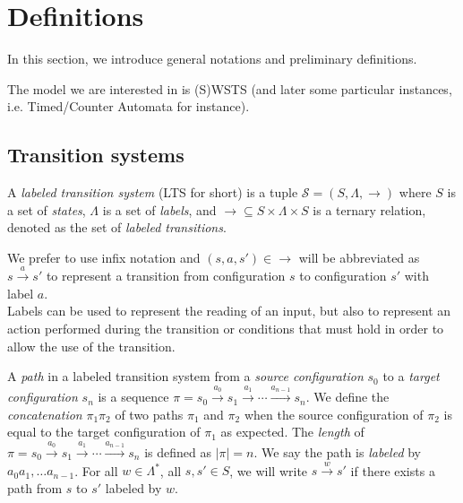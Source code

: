 
\section{Definitions}\label{section definitions}



In this section, we introduce general notations and preliminary definitions.

The model we are interested in is (S)WSTS (and later some particular instances, i.e. Timed/Counter Automata for instance).




\subsection{Transition systems}


\begin{definition}
A {\em labeled transition system} (LTS for short) is a tuple $\mathscr{S}=(S, \Lambda, \rightarrow)$ where 
$S$ is a set of {\em states}, $ \Lambda$ is a set of {\em labels}, and 
${\rightarrow} \subseteq S\times \Lambda \times S$ is a 
ternary relation,
denoted as the set of {\em labeled transitions}. 
\end{definition}

We
 prefer to use infix notation and $(s,a ,s')\in {\rightarrow} $ will be abbreviated as
       $s  \xrightarrow{a}  s'$
to represent a transition from configuration $s$ to configuration $s'$ with label $a$. \\

\noindent
Labels can be used to represent the reading of an input, but also to represent an action performed during the transition or conditions that must hold in order to allow the use of the transition.


A {\em path} in a labeled transition system from a {\em source configuration} $s_0$
to a {\em target configuration} $s_n$ is a sequence 
$\pi = s_0 \xrightarrow{a_0 } s_1 \xrightarrow{a_1 } \cdots \xrightarrow{a_{n-1} } s_n$. 
We define the {\em concatenation} $ \pi_1 \pi_2$ of 
two paths $\pi_1$ and $\pi_2$ when the source configuration of $\pi_2$ is equal to the target configuration of $\pi_1$
as expected.
The {\em length} of 
$\pi = s_0 \xrightarrow{a_0 } s_1 \xrightarrow{a_1 } \cdots \xrightarrow{a_{n-1} } s_n$
is defined as $|\pi|=n$. We say the path is {\em labeled} by $a_0 a_1 , \ldots a_{n-1}$.
For all $w \in \Lambda^*$, all $s,s' \in S$, we will write $s \xrightarrow{w } s'$ if there exists a path from $s$ to $s'$ labeled by $w$. 

